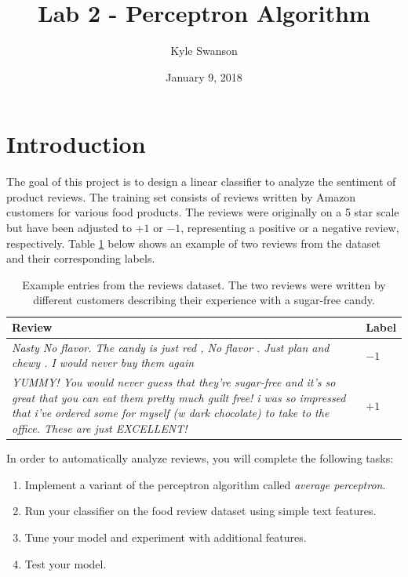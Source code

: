 \documentclass{article}
\title{Lab 2 - Perceptron Algorithm}
\author{Kyle Swanson}
\date{January 9, 2018}
\begin{document}
\maketitle

\section{Introduction}

The goal of this project is to design a linear classifier to analyze the sentiment of product reviews. The training set consists of reviews written by Amazon customers for various food products. The reviews were originally on a 5 star scale but have been adjusted to $+1$ or $-1$, representing a positive or a negative review, respectively. Table \ref{reviews} below shows an example of two reviews from the dataset and their corresponding labels.

\begin{table}[H]
    \begin{center}
        \begin{tabular}{ p{100mm} p{15mm} }
            \hline
            Review & Label \\
            \hline
            \textit{Nasty No flavor. The candy is just red , No flavor . Just plan and chewy . I would never buy them again} & $-1$ \\
            \hline
            \textit{YUMMY! You would never guess that they’re sugar-free and it’s so great that you can eat them pretty much guilt free! i was so impressed that i’ve ordered some for myself (w dark chocolate) to take to the office. These are just EXCELLENT!} & $+1$ \\
            \hline
        \end{tabular}
        \caption{Example entries from the reviews dataset. The two reviews were written by different customers describing their experience with a sugar-free candy.}
        \label{reviews}
    \end{center}
\end{table}

\noindent
In order to automatically analyze reviews, you will complete the following tasks:

\begin{enumerate}
    \item Implement a variant of the perceptron algorithm called \textit{average perceptron}.
    \item Run your classifier on the food review dataset using simple text features.
    \item Tune your model and experiment with additional features.
    \item Test your model.
\end{enumerate}
\end{document}
